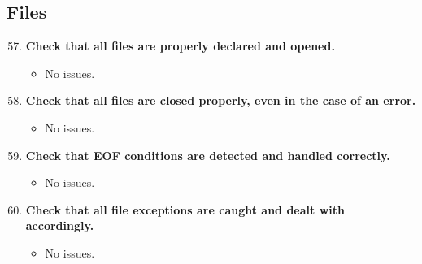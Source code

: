 \documentclass{article}
\begin{document}
		\subsection{Files}
			\begin{enumerate}
				\setcounter{enumi}{56}
				\item \textbf{Check that all files are properly declared and opened.}
				\begin{itemize}
					\item No issues.
				\end{itemize}
				\item \textbf{Check that all files are closed properly, even in the case of an error.}
				\begin{itemize}
					\item No issues.
				\end{itemize}
				\item \textbf{Check that EOF conditions are detected and handled correctly.}
				\begin{itemize}
					\item No issues.
				\end{itemize}
				\item \textbf{Check that all file exceptions are caught and dealt with accordingly.}
				\begin{itemize}
					\item No issues.
				\end{itemize}
			\end{enumerate}
		\pagebreak
\end{document}
